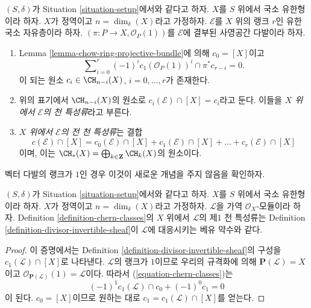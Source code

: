 \begin{definition}
\label{definition-chern-classes}
$(S, \delta)$가 Situation \ref{situation-setup}에서와 같다고 하자.
$X$를 $S$ 위에서 국소 유한형이라 하자. $X$가 정역이고
$n = \dim_\delta(X)$라고 가정하자. $\mathcal{E}$를 $X$ 위의 랭크 $r$인
유한 국소 자유층이라 하자.
$(\pi : P \to X, \mathcal{O}_P(1))$를 $\mathcal{E}$에 결부된 사영공간
다발이라 하자.
\begin{enumerate}
\item Lemma \ref{lemma-chow-ring-projective-bundle}에 의해
$c_0 = [X]$이고
\begin{equation}
\label{equation-chern-classes}
\sum\nolimits_{i = 0}^r
(-1)^i c_1(\mathcal{O}_P(1))^i \cap \pi^*c_{r - i}
= 0.
\end{equation}
이 되는 원소 $c_i \in \CH_{n - i}(X)$, $i = 0, \ldots, r$가 존재한다.
\item 위의 표기에서 $\CH_{n - i}(X)$의 원소로
$c_i(\mathcal{E}) \cap [X] = c_i$라고 둔다. 이들을
{\it $X$ 위에서 $\mathcal{E}$의 천 특성류}라고 부른다.
\item {\it $X$ 위에서 $\mathcal{E}$의 전 천 특성류}는 결합
$$
c({\mathcal E}) \cap [X] =
c_0({\mathcal E}) \cap [X]
+ c_1({\mathcal E}) \cap [X] + \ldots
+ c_r({\mathcal E}) \cap [X]
$$
이며, 이는
$\CH_*(X) = \bigoplus_{k \in \mathbf{Z}} \CH_k(X)$의 원소이다.
\end{enumerate}
\end{definition}

\noindent
벡터 다발의 랭크가 $1$인 경우 이것이 새로운 개념을 주지 않음을
확인하자.

\begin{lemma}
\label{lemma-first-chern-class}
$(S, \delta)$가 Situation \ref{situation-setup}에서와 같다고 하자.
$X$를 $S$ 위에서 국소 유한형이라 하자. $X$가 정역이고
$n = \dim_\delta(X)$라고 가정하자. $\mathcal{L}$을 가역
$\mathcal{O}_X$-모듈이라 하자. Definition \ref{definition-chern-classes}의
$X$ 위에서 $\mathcal{L}$의 제1 천 특성류는 Definition
\ref{definition-divisor-invertible-sheaf}이 $\mathcal{L}$에 대응시키는
베유 약수와 같다.
\end{lemma}

\begin{proof}
이 증명에서는 Definition \ref{definition-divisor-invertible-sheaf}의
구성을 $c_1(\mathcal{L}) \cap [X]$로 나타낸다. $\mathcal{L}$의 랭크가
$1$이므로 우리의 규격화에 의해
$\mathbf{P}(\mathcal{L}) = X$이고
$\mathcal{O}_{\mathbf{P}(\mathcal{L})}(1) = \mathcal{L}$이다. 따라서
(\ref{equation-chern-classes})는
$$
(-1)^1 c_1(\mathcal{L}) \cap c_0 + (-1)^0 c_1 = 0
$$
이 된다. $c_0 = [X]$이므로 원하는 대로
$c_1 = c_1(\mathcal{L}) \cap [X]$를 얻는다.
\end{proof}

